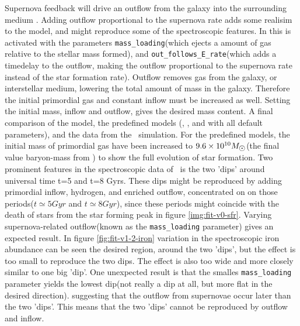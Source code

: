 Supernova feedback will drive an outflow from the galaxy into the surrounding medium . Adding outflow proportional to the supernova rate adds some realisim to the model, and might reproduce some of the spectroscopic features.
In \omegamodel this is activated with the parameters \verb|mass_loading|(which ejects a amount of gas relative to the stellar mass formed), and \verb|out_follows_E_rate|(which adds a timedelay to the outflow, making the outflow proportional to the supernova rate instead of the star formation rate).
Outflow removes gas from the galaxy, or interstellar medium, lowering the total amount of mass in the galaxy. Therefore the initial primordial gas and constant inflow must be increased as well.
Setting the initial mass, inflow and outflow, gives the desired mass content.
A final comparison of the \fiduccialomega model, the predefined models (\mwomega, \mwcomega, and \omegamodel with all default parameters), and the data from the \eris\ simulation.
For the predefined models, the initial mass of primordial gas have been increased to $9.6\times10^{10}\msol$(the final value baryon-mass from \eris) to show the full evolution of star formation.
Two prominent features in the spectroscopic data of \eris\ is the two 'dips' around universal time t=5 and t=8 Gyrs. These dips might be reproduced by adding primordial inflow, hydrogen, and enriched outflow, concentrated on on those periods($t\simeq5Gyr$ and $t\simeq8Gyr$), since these periods might coincide with the death of stars from the star forming peak in figure \ref{img:fit-v0-sfr}.
Varying supernova-related outflow(known as the \texttt{mass\_loading} parameter) gives an expected result. In figure \ref{fig:fit-v1-2-iron} variation in the spectroscopic iron abundance can be seen the desired region, around the two 'dips', but the effect is too small to reproduce the two dips. The effect is also too wide and more closely similar to one big 'dip'. One unexpected result is that the smalles \texttt{mass\_loading} parameter yields the lowest dip(not really a dip at all, but more flat in the desired direction). suggesting that the outflow from supernovae occur later than the two 'dips'.
This means that the two 'dips' cannot be reproduced by outflow and inflow.

